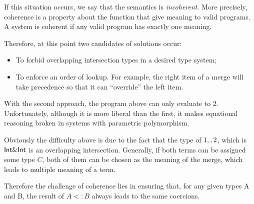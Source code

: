If this situation occurs, we say that the semantics is \emph{incoherent}.
More precisely, coherence is a property about the function that give meaning to valid programs.
A system is coherent if any valid program has exactly one meaning.

Therefore, at this point two candidates of solutions occur:
\begin{itemize}
    \item To forbid overlapping intersection types in a desired type
    system;
    \item To enforce an order of lookup. For example, the right
    item of a merge will take precedence so that it can ``override'' the left
    item.
\end{itemize}

With the second approach, the program above can only evaluate to $2$.
Unfortunately, although it is more liberal than the first,
it makes equational reasoning broken in systems with parametric polymorphism.

Obviously the difficulty above is due to the fact that the type of $1 ,,
2$, which is $\textsf{Int} \& \textsf{Int}$ is an overlapping intersection.
Generally, if both terms can be assigned some type $C$,
both of them can be chosen as the meaning of the merge,
which leads to multiple meaning of a term.

Therefore the challenge of coherence lies in ensuring that, for any given
types A and B, the result of $A <: B$ always leads to the same coercions.



